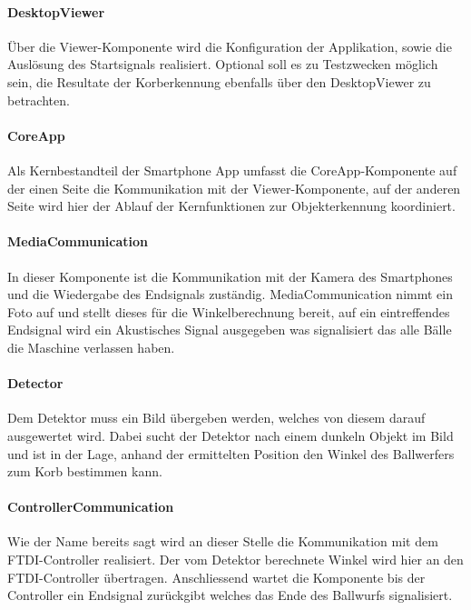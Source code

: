 		\paragraph{DesktopViewer\\}
		Über die Viewer-Komponente wird die Konfiguration der Applikation, sowie die Auslösung des Startsignals realisiert. Optional soll es zu Testzwecken möglich sein, die Resultate der Korberkennung ebenfalls über den DesktopViewer zu betrachten.
		
		\paragraph{CoreApp\\}
		Als Kernbestandteil der Smartphone App umfasst die CoreApp-Komponente auf der einen Seite die Kommunikation mit der Viewer-Komponente, auf der anderen Seite wird hier der Ablauf der Kernfunktionen zur Objekterkennung koordiniert.		
		
		\paragraph{MediaCommunication\\}
		In dieser Komponente ist die Kommunikation mit der Kamera des Smartphones und die Wiedergabe des Endsignals zuständig. MediaCommunication nimmt ein Foto auf und stellt dieses für die Winkelberechnung bereit, auf ein eintreffendes Endsignal wird ein Akustisches Signal ausgegeben was signalisiert das alle Bälle die Maschine verlassen haben.
		
		\paragraph{Detector\\}
		Dem Detektor muss ein Bild übergeben werden, welches von diesem darauf ausgewertet wird. Dabei sucht der Detektor nach einem dunkeln Objekt im Bild und ist in der Lage, anhand der ermittelten Position den Winkel des Ballwerfers zum Korb bestimmen kann.
		

		\paragraph{ControllerCommunication\\}
		Wie der Name bereits sagt wird an dieser Stelle die Kommunikation mit dem FTDI-Controller realisiert. Der vom Detektor berechnete Winkel wird hier an den FTDI-Controller übertragen. Anschliessend wartet die Komponente bis der Controller ein Endsignal zurückgibt welches das Ende des Ballwurfs signalisiert.
		
